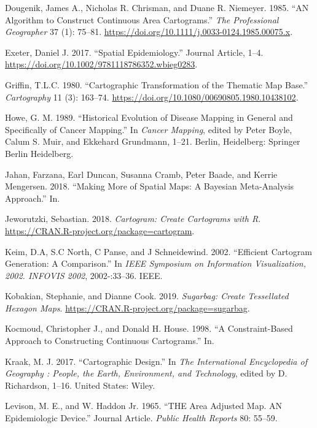 \documentclass[11pt,]{article}
\begin{document}
\leavevmode\hypertarget{ref-ACCAC}{}%
Dougenik, James A., Nicholas R. Chrisman, and Duane R. Niemeyer. 1985.
``AN Algorithm to Construct Continuous Area Cartograms.'' \emph{The
Professional Geographer} 37 (1): 75--81.
\url{https://doi.org/10.1111/j.0033-0124.1985.00075.x}.

\leavevmode\hypertarget{ref-SE}{}%
Exeter, Daniel J. 2017. ``Spatial Epidemiology.'' Journal Article, 1--4.
\url{https://doi.org/10.1002/9781118786352.wbieg0283}.

\leavevmode\hypertarget{ref-CTTMB}{}%
Griffin, T.L.C. 1980. ``Cartographic Transformation of the Thematic Map
Base.'' \emph{Cartography} 11 (3): 163--74.
\url{https://doi.org/10.1080/00690805.1980.10438102}.

\leavevmode\hypertarget{ref-HEDP}{}%
Howe, G. M. 1989. ``Historical Evolution of Disease Mapping in General
and Specifically of Cancer Mapping.'' In \emph{Cancer Mapping}, edited
by Peter Boyle, Calum S. Muir, and Ekkehard Grundmann, 1--21. Berlin,
Heidelberg: Springer Berlin Heidelberg.

\leavevmode\hypertarget{ref-MTMSIH}{}%
Jahan, Farzana, Earl Duncan, Susanna Cramb, Peter Baade, and Kerrie
Mengersen. 2018. ``Making More of Spatial Maps: A Bayesian Meta-Analysis
Approach.'' In.

\leavevmode\hypertarget{ref-cartogram}{}%
Jeworutzki, Sebastian. 2018. \emph{Cartogram: Create Cartograms with R}.
\url{https://CRAN.R-project.org/package=cartogram}.

\leavevmode\hypertarget{ref-ECGC}{}%
Keim, D.A, S.C North, C Panse, and J Schneidewind. 2002. ``Efficient
Cartogram Generation: A Comparison.'' In \emph{IEEE Symposium on
Information Visualization, 2002. INFOVIS 2002}, 2002-:33--36. IEEE.

\leavevmode\hypertarget{ref-sugarbag}{}%
Kobakian, Stephanie, and Dianne Cook. 2019. \emph{Sugarbag: Create
Tessellated Hexagon Maps}.
\url{https://CRAN.R-project.org/package=sugarbag}.

\leavevmode\hypertarget{ref-CBATCC}{}%
Kocmoud, Christopher J., and Donald H. House. 1998. ``A Constraint-Based
Approach to Constructing Continuous Cartograms.'' In.

\leavevmode\hypertarget{ref-CD}{}%
Kraak, M. J. 2017. ``Cartographic Design.'' In \emph{The International
Encyclopedia of Geography : People, the Earth, Environment, and
Technology}, edited by D. Richardson, 1--16. United States: Wiley.

\leavevmode\hypertarget{ref-TAAM}{}%
Levison, M. E., and W. Haddon Jr. 1965. ``THE Area Adjusted Map. AN
Epidemiologic Device.'' Journal Article. \emph{Public Health Reports}
80: 55--59.
\end{document}
